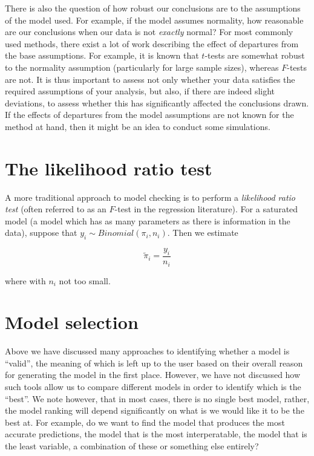 There is also the question of how robust our conclusions are to the assumptions of the model used. For example, if the model assumes normality, how reasonable are our conclusions when our data is not \textit{exactly} normal? For most commonly used methods, there exist a lot of work describing the effect of departures from the base assumptions. For example, it is known that $t$-tests are somewhat robust to the normality assumption (particularly for large sample sizes), whereas $F$-tests are not. It is thus important to assess not only whether your data satisfies the required assumptions of your analysis, but also, if there are indeed slight deviations, to assess whether this has significantly affected the conclusions drawn. If the effects of departures from the model assumptions are not known for the method at hand, then it might be an idea to conduct some simulations.


\section{The likelihood ratio test}

A more traditional approach to model checking is to perform a \textit{likelihood ratio test} (often referred to as an $F$-test in the regression literature). For a saturated model (a model which has as many parameters as there is information in the data), suppose that $y_i \sim Binomial(\pi_i, n_i)$. Then we estimate

$$\tilde{\pi}_i  = \frac{y_i}{n_i}$$

where  with $n_i$ not too small. 



\section{Model selection}

Above we have discussed many approaches to identifying whether a model is ``valid'', the meaning of which is left up to the user based on their overall reason for generating the model in the first place. However, we have not discussed how such tools allow us to compare different models in order to identify which is the ``best''. We note however, that in most cases, there is no single best model, rather, the model ranking will depend significantly on what is we would like it to be the best at. For example, do we want to find the model that produces the most accurate predictions, the model that is the most interperatable, the model that is the least variable, a combination of these or something else entirely?

